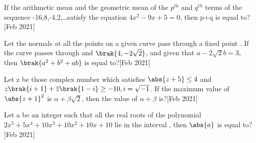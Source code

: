 \item If the arithmetic mean and the geometric mean of the $p^{th}$ and $q^{th}$ terms of the sequence -16,8,-4,2,\ldots satisfy the equation $4x^2-9x+5=0$, then p+q is equal to?\vspace{0.5mm}\hfill [Feb 2021]\\
\item Let the normals at all the points on a given curve pass through a fixed point . If the curve passes through  and $\brak{4,-2\sqrt{2}}$, and given that $a-2\sqrt{2}b = 3$, then $\brak{a^2+b^2+ab}$ is equal to?\vspace{0.5mm}\hfill [Feb 2021]\\
\item Let z be those complex number which satisfies $\abs{z+5}\leq 4$ and $z\brak{i+1}+\overline{z}\brak{1-i}\geq-10, i = \sqrt{-1}$. If the maximum value of $\abs{z+1}^2$ is $\alpha + \beta \sqrt{2}$, then the value of $\alpha+\beta$ is?\vspace{0.5mm}\hfill [Feb 2021]\\
\item Let a be an integer such that all the real roots of the polynomial $2x^5+5x^4+10x^3+10x^2+10x+10$ lie in the interval , then $\abs{a}$ is equal to?\hfill [Feb 2021]

